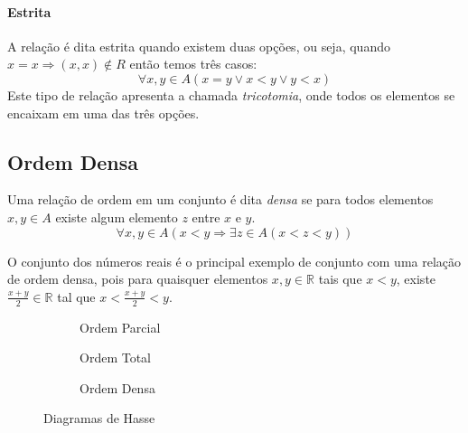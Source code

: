 \paragraph*{Estrita}
A relação é dita estrita quando existem duas opções, ou seja, quando $x=x \Rightarrow (x,x) \not \in R$ então temos três casos: 
\[\forall x,y \in A \left( x=y \vee x < y \vee y < x \right)\]
Este tipo de relação apresenta a chamada \emph{tricotomia}, onde todos os elementos se encaixam em uma das três opções.

\subsection{Ordem Densa}
Uma relação de ordem em um conjunto é dita \emph{densa} se para todos elementos $x,y \in A$ existe algum elemento $z$ entre $x$ e $y$.
\[\forall x,y \in A \left( x<y \Rightarrow \exists z \in A \left(x<z<y\right) \right)\] \par 
O conjunto dos números reais é o principal exemplo de conjunto com uma relação de ordem densa, pois para quaisquer elementos $x,y \in \mathbb{R}$ tais que $x < y$, existe $\frac{x+y}{2} \in \mathbb{R}$ tal que $x < \frac{x+y}{2} < y$.

\begin{figure}[H]
\centering
	\begin{subfigure}[b]{0.3\textwidth}
	\centering
	\caption{Ordem Parcial}
	\end{subfigure}
	\quad
	\begin{subfigure}[b]{0.3\textwidth}
	\centering
	\caption{Ordem Total}
	\end{subfigure}
	\quad 
	\begin{subfigure}[b]{0.3\textwidth}
	\centering
	\caption{Ordem Densa}
	\end{subfigure}
\caption{Diagramas de Hasse}
\end{figure}

